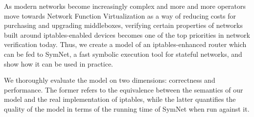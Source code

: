 
As modern networks become increasingly complex and more and more operators move
towards Network Function Virtualization as a way of reducing costs for
purchasing and upgrading middleboxes, verifying certain properties of networks
built around iptables-enabled devices becomes one of the top priorities in
network verification today.  Thus, we create a model of an iptables-enhanced
router which can be fed to SymNet, a fast symbolic execution tool for stateful
networks, and show how it can be used in practice.

We thoroughly evaluate the model on two dimensions: correctness and
performance.  The former refers to the equivalence between the semantics of our
model and the real implementation of iptables, while the latter quantifies the
quality of the model in terms of the running time of SymNet when run against
it.

